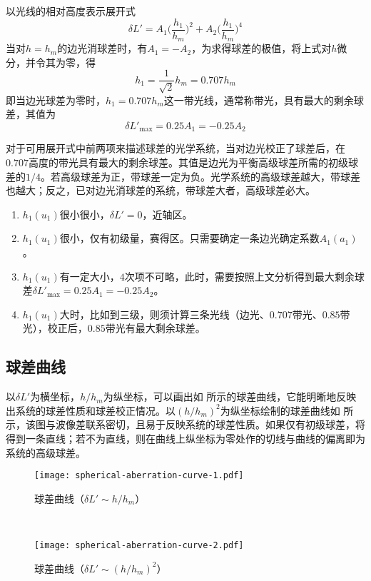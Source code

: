 以光线的相对高度表示展开式
\begin{equation}
\delta L'=A_1\bigg(\frac{h_1}{h_m}\bigg)^2+A_2\bigg(\frac{h_1}{h_m}\bigg)^4
\end{equation}
当对$h=h_m$的边光消球差时，有$A_1=-A_2$，为求得球差的极值，将上式对$h$微分，并令其为零，得
\begin{equation}
h_1=\frac{1}{\sqrt{2}}h_m=0.707h_m
\end{equation}
即当边光球差为零时，$h_1=0.707h_m$这一带光线，通常称带光，具有最大的剩余球差，其值为
\begin{equation}
\delta L'_{\max}=0.25A_1=-0.25A_2
\end{equation}
\begin{conclusion}
对于可用展开式中前两项来描述球差的光学系统，当对边光校正了球差后，在$0.707$高度的带光具有最大的剩余球差。其值是边光为平衡高级球差所需的初级球差的$1/4$。若高级球差为正，带球差一定为负。光学系统的高级球差越大，带球差也越大；反之，已对边光消球差的系统，带球差大者，高级球差必大。
\end{conclusion}
\begin{note}
	\begin{enumerate}
		\item $h_1(u_1)$很小很小，$\delta L'=0$，近轴区。
		\item $h_1(u_1)$很小，仅有初级量，赛得区。只需要确定一条边光确定系数$A_1(a_1)$。
		\item $h_1(u_1)$有一定大小，$4$次项不可略，此时，需要按照上文分析得到最大剩余球差$\delta L'_{\mathrm{max}}=0.25A_1=-0.25A_2$。
		\item $h_1(u_1)$大时，比如到三级，则须计算三条光线（边光、$0.707$带光、$0.85$带光），校正后，$0.85$带光有最大剩余球差。
	\end{enumerate}
\end{note}

\subsection{球差曲线}
以$\delta L'$为横坐标，$h/h_m$为纵坐标，可以画出如 所示的球差曲线，它能明晰地反映出系统的球差性质和球差校正情况。以$(h/h_m)^2$为纵坐标绘制的球差曲线如 所示，该图与波像差联系密切，且易于反映系统的球差性质。如果仅有初级球差，将得到一条直线；若不为直线，则在曲线上纵坐标为零处作的切线与曲线的偏离即为系统的高级球差。

\begin{figure}[htbp]
	\centering
	\begin{minipage}[t]{0.45\textwidth}
		\centering
		\texttt{[image: spherical-aberration-curve-1.pdf]}
		\caption{球差曲线（$\delta L'\sim h/h_m$）}
		\label{fig:spherical-aberration-curve-1}
	\end{minipage}
	\ 
	\begin{minipage}[t]{0.45\textwidth}
		\centering
		\texttt{[image: spherical-aberration-curve-2.pdf]}
		\caption{球差曲线（$\delta L'\sim (h/h_m)^2$）}
		\label{fig:spherical-aberration-curve-2}
	\end{minipage}
\end{figure}

